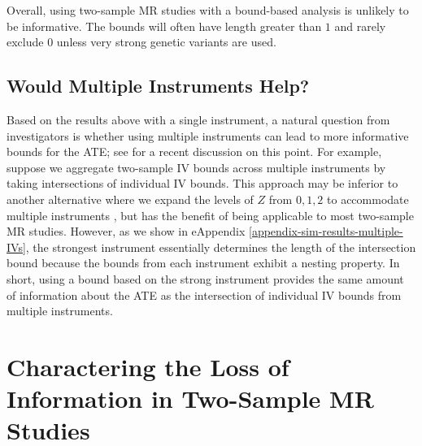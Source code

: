 \documentclass[
]{article}
\theoremstyle{plain}
\begin{document}
Overall, using two-sample MR studies with a bound-based analysis is unlikely to be informative. The bounds will often have length greater than \(1\) and rarely exclude \(0\) unless very strong genetic variants are used.

\hypertarget{would-multiple-instruments-help}{%
\subsection{Would Multiple Instruments Help?}\label{would-multiple-instruments-help}}

Based on the results above with a single instrument, a natural question from investigators is whether using multiple instruments can lead to more informative bounds for the ATE; see \textcite{swanson_commentary_2017} for a recent discussion on this point. For example, suppose we aggregate two-sample IV bounds across multiple instruments by taking intersections of individual IV bounds. This approach may be inferior to another alternative where we expand the levels of \(Z\) from \(0,1,2\) to accommodate multiple instruments \autocite{swanson_commentary_2017}, but has the benefit of being applicable to most two-sample MR studies. However, as we show in eAppendix \ref{appendix-sim-results-multiple-IVs}, the strongest instrument essentially determines the length of the intersection bound because the bounds from each instrument exhibit a nesting property. In short, using a bound based on the strong instrument provides the same amount of information about the ATE as the intersection of individual IV bounds from multiple instruments.

\hypertarget{charactering-the-loss-of-information-in-two-sample-mr-studies}{%
\section{Charactering the Loss of Information in Two-Sample MR Studies}\label{charactering-the-loss-of-information-in-two-sample-mr-studies}}

\label{quasi-bayesian}
\end{document}
